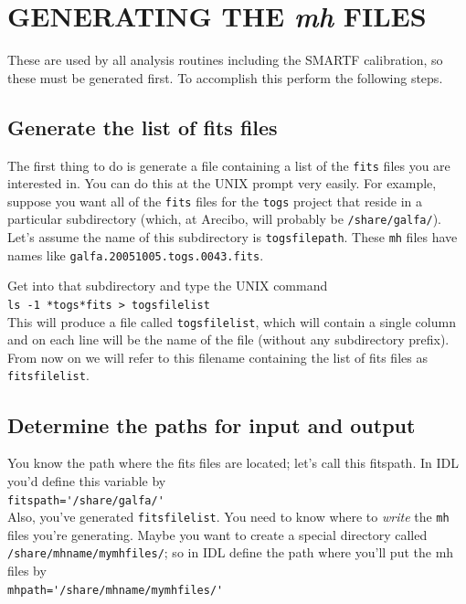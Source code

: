 \documentclass[psfig,preprint]{aastex}
\begin{document}
\section{GENERATING THE {\it mh} FILES} \label{mhfiles}

	These are used by all analysis routines including the SMARTF
calibration, so these must be generated first. To accomplish this
perform the following steps.

\subsection{Generate the list of fits files} \label{fitsfilegen}

        The first thing to do is generate a file containing a list of
the \verb$fits$ files you are interested in.  You can do this at the UNIX
prompt very easily.  For example, suppose you want all of the \verb$fits$
files for the \verb$togs$ project that reside in a particular
subdirectory (which, at Arecibo, will probably be
\verb$/share/galfa/$). Let's assume the name of this subdirectory is
\verb$togsfilepath$. These \verb$mh$ files have names like
\verb$galfa.20051005.togs.0043.fits$. 

        Get into that subdirectory and type the UNIX command \\
\verb$ls -1 *togs*fits > togsfilelist$ \\
This will produce a file called \verb$togsfilelist$, which will contain
a single column and on each line will be the name of the file (without
any subdirectory prefix). From now on we will refer to this filename
containing the list of fits files as \verb$fitsfilelist$. 

\subsection{Determine the paths for input and output}

	You know the path where the fits files are located; let's call
this fitspath.  In IDL you'd define this variable by \\ 
\verb$fitspath='/share/galfa/'$ \\ 
Also, you've generated \verb$fitsfilelist$.  You need to
know where to {\it write} the \verb$mh$ files you're generating.  Maybe
you want to create a special directory called
\verb$/share/mhname/mymhfiles/$; so in IDL define the path where you'll
put the mh files by \\ 
\verb$mhpath='/share/mhname/mymhfiles/'$
\end{document}
